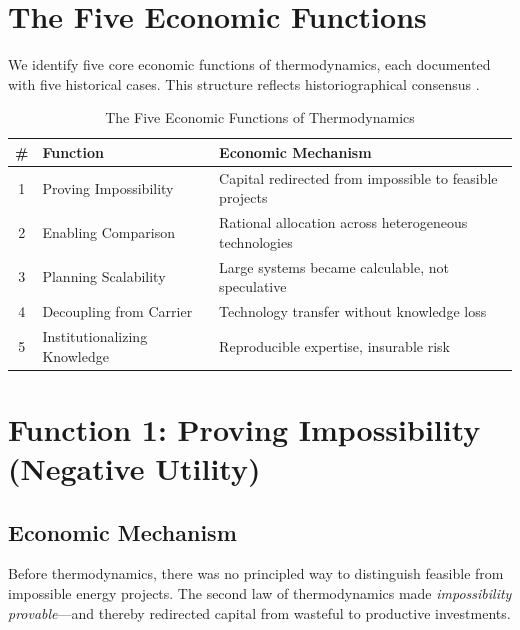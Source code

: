\section{The Five Economic Functions}
\label{sec:thermo-functions}

We identify five core economic functions of thermodynamics, each documented
with five historical cases. This structure reflects historiographical consensus
\citep{landes1969unbound, mokyr2002gifts, allen2009british}.

\begin{table}[htbp]
\centering
\caption{The Five Economic Functions of Thermodynamics}
\label{tab:thermo-functions}
\renewcommand{\arraystretch}{1.4}
\begin{tabular}{@{}clp{7cm}@{}}
\toprule
\textbf{\#} & \textbf{Function} & \textbf{Economic Mechanism} \\
\midrule
1 & Proving Impossibility & Capital redirected from impossible to feasible projects \\
2 & Enabling Comparison & Rational allocation across heterogeneous technologies \\
3 & Planning Scalability & Large systems became calculable, not speculative \\
4 & Decoupling from Carrier & Technology transfer without knowledge loss \\
5 & Institutionalizing Knowledge & Reproducible expertise, insurable risk \\
\bottomrule
\end{tabular}
\end{table}


\section{Function 1: Proving Impossibility (Negative Utility)}
\label{sec:thermo-impossibility}

\subsection{Economic Mechanism}

Before thermodynamics, there was no principled way to distinguish feasible
from impossible energy projects. The second law of thermodynamics made
\textit{impossibility provable}---and thereby redirected capital from
wasteful to productive investments.

